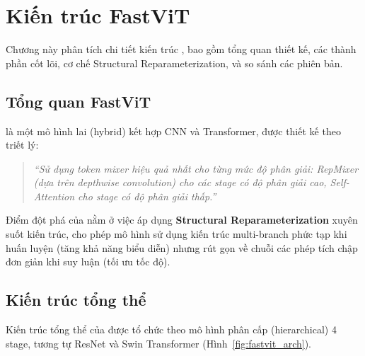\chapter{Kiến trúc FastViT}
\label{chap:architecture}

Chương này phân tích chi tiết kiến trúc \fastvit{} \cite{fastvit2023}, bao gồm tổng quan thiết kế, các thành phần cốt lõi, cơ chế Structural Reparameterization, và so sánh các phiên bản.

\section{Tổng quan FastViT}
\label{sec:fastvit_overview}

\fastvit{} là một mô hình lai (hybrid) kết hợp CNN và Transformer, được thiết kế theo triết lý:

\begin{quote}
\textit{``Sử dụng token mixer hiệu quả nhất cho từng mức độ phân giải: RepMixer (dựa trên depthwise convolution) cho các stage có độ phân giải cao, Self-Attention cho stage có độ phân giải thấp.''}
\end{quote}

Điểm đột phá của \fastvit{} nằm ở việc áp dụng \textbf{Structural Reparameterization} xuyên suốt kiến trúc, cho phép mô hình sử dụng kiến trúc multi-branch phức tạp khi huấn luyện (tăng khả năng biểu diễn) nhưng rút gọn về chuỗi các phép tích chập đơn giản khi suy luận (tối ưu tốc độ).

\section{Kiến trúc tổng thể}
\label{sec:overall_architecture}

Kiến trúc tổng thể của \fastvit{} được tổ chức theo mô hình phân cấp (hierarchical) 4 stage, tương tự ResNet và Swin Transformer (Hình~\ref{fig:fastvit_arch}).

